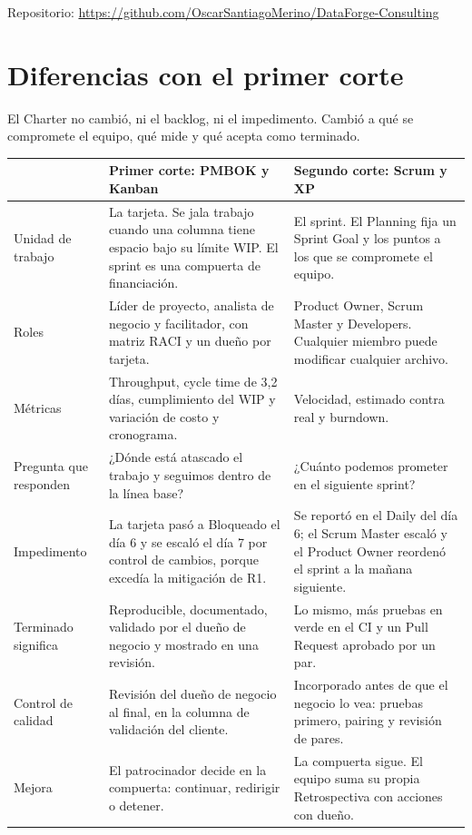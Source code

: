 \documentclass[10pt,a4paper]{article}
\newcommand{\repourl}{https://github.com/OscarSantiagoMerino/DataForge-Consulting}
\begin{document}
Repositorio: \url{\repourl}

\section{Diferencias con el primer corte}
El Charter no cambió, ni el backlog, ni el impedimento. Cambió a qué se compromete el equipo, qué mide y qué acepta
como terminado.

{\footnotesize
\begin{tabularx}{\linewidth}{@{}>{\raggedright\arraybackslash}p{2.5cm} L L@{}}
\toprule
 & Primer corte: PMBOK y Kanban & Segundo corte: Scrum y XP \\
\midrule
Unidad de trabajo & La tarjeta. Se jala trabajo cuando una columna tiene espacio bajo su límite WIP. El sprint es una compuerta de financiación. & El sprint. El Planning fija un Sprint Goal y los puntos a los que se compromete el equipo. \\
Roles & Líder de proyecto, analista de negocio y facilitador, con matriz RACI y un dueño por tarjeta. & Product Owner, Scrum Master y Developers. Cualquier miembro puede modificar cualquier archivo. \\
Métricas & Throughput, cycle time de 3,2 días, cumplimiento del WIP y variación de costo y cronograma. & Velocidad, estimado contra real y burndown. \\
Pregunta que responden & ¿Dónde está atascado el trabajo y seguimos dentro de la línea base? & ¿Cuánto podemos prometer en el siguiente sprint? \\
Impedimento & La tarjeta pasó a Bloqueado el día 6 y se escaló el día 7 por control de cambios, porque excedía la mitigación de R1. & Se reportó en el Daily del día 6; el Scrum Master escaló y el Product Owner reordenó el sprint a la mañana siguiente. \\
Terminado significa & Reproducible, documentado, validado por el dueño de negocio y mostrado en una revisión. & Lo mismo, más pruebas en verde en el CI y un Pull Request aprobado por un par. \\
Control de calidad & Revisión del dueño de negocio al final, en la columna de validación del cliente. & Incorporado antes de que el negocio lo vea: pruebas primero, pairing y revisión de pares. \\
Mejora & El patrocinador decide en la compuerta: continuar, redirigir o detener. & La compuerta sigue. El equipo suma su propia Retrospectiva con acciones con dueño. \\
\bottomrule
\end{tabularx}}
\end{document}

